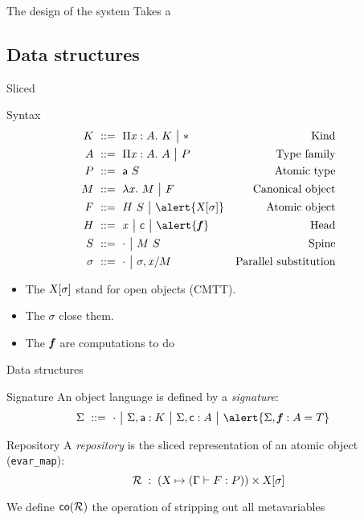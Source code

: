 
\begin{frame}{The design of the system}
  Takes a
\end{frame}

\subsection{Data structures}

\begin{frame}{Sliced \LF}
  \begin{block}{Syntax}
  \begin{align*}
    K &\gequal \prd x A K \gor \type &
    \text{Kind}\\
    A &\gequal \prd x A A \gor P &
    \text{Type family} \\
    P &\gequal \app {\cst a} S &
    \text{Atomic type} \\
    M &\gequal \lam x M \gor F &
    \text{Canonical object} \\
    F &\gequal \app H S \gor \alert{\smeta X \sigma} &
    \text{Atomic object} \\
    H &\gequal \var x \gor \cst c \gor \alert{\fct{f}} &
    \text{Head}\\
    S &\gequal \spinenil \gor \spinecons M S &
    \text{Spine}\\
    \sigma &\gequal \msubstnil \gor \msubstcons \sigma x M &
    \text{Parallel substitution}
  \end{align*}
  \vspace{-1.5em}
  \begin{itemize}
    \item The ${\text{\textsl{X}}}[{\sigma}]$ stand for open objects (CMTT).
    \item The $\sigma$ close them.
    \item The $\text{\textit{\textbf{f}}}$ are computations to do
  \end{itemize}
  \end{block}
\end{frame}

\begin{frame}[fragile]{Data structures}
  \begin{block}{Signature}
    An object language is defined by a \emph{signature}:
    \begin{align*}
      \Sigma &\gequal \gnil \gor \gcons \Sigma {\cst a : K} \gor \gcons
      \Sigma {\cst c : A} \gor \alert{\gcons \Sigma {\fct f : A = T}}
    \end{align*}
  \end{block}
  \begin{block}{Repository}
    A \emph{repository} is the sliced representation of an atomic object (\verb'evar_map'):
    $$ \mathcal{R}\;:\;(\text{\textsl{X}} \mapsto (\Gamma\vdash{F}:{P}))\times{\ensuremath{\text{\textsl{X}}}}[{\sigma}] $$

    We define ${\text{\textsf{co}}}({\mathcal{R}})$ the operation of stripping out all metavariables
  \end{block}
\end{frame}

